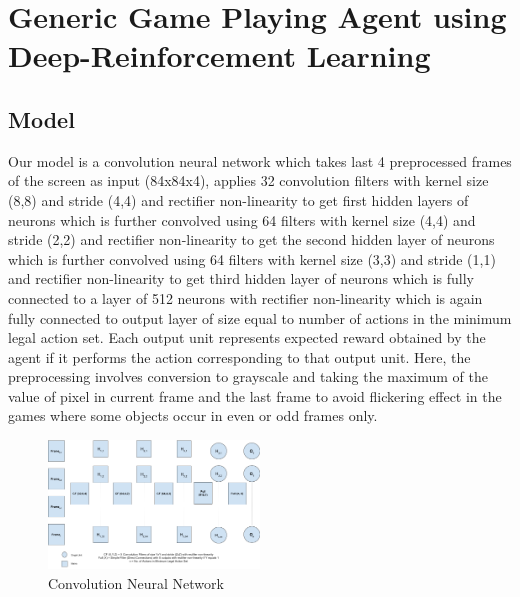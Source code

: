 \documentclass[conference]{IEEEtran}
\begin{document}
\section{Generic Game Playing Agent using Deep-Reinforcement Learning}

\subsection{Model}
Our model is a convolution neural network which takes last 4 preprocessed frames of the screen as input (84x84x4), applies 32 convolution filters with kernel size (8,8) and stride (4,4) and rectifier non-linearity to get first hidden layers of neurons which is further convolved using 64 filters with kernel size (4,4) and stride (2,2) and rectifier non-linearity to get the second hidden layer of neurons which is further convolved using 64 filters with kernel size (3,3) and stride (1,1) and rectifier non-linearity to get third hidden layer of neurons which is fully connected to a layer of 512 neurons with rectifier non-linearity which is again fully connected to output layer of size equal to number of actions in the minimum legal action set. Each output unit represents expected reward obtained by the agent if it performs the action corresponding to that output unit. Here, the preprocessing involves conversion to grayscale and taking the maximum of the value of pixel in current frame and the last frame to avoid flickering effect in the games where some objects occur in even or odd frames only.

\begin{figure}[h]
\includegraphics[width=0.5\textwidth]{cnn}
\caption[width=\textwidth]{Convolution Neural Network}
\label{fig:cnn}
\end{figure}
\end{document}
